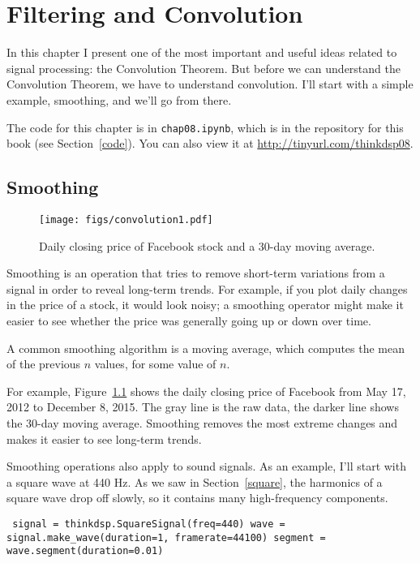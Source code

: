 \documentclass[12pt]{book} \usepackage[width=5.5in,height=8.5in, hmarginratio=3:2,vmarginratio=1:1]{geometry}
\begin{document}
\chapter{Filtering and Convolution} 

In this chapter I present one of the most important and useful ideas related to signal processing: the Convolution Theorem. But before we can understand the Convolution Theorem, we have to understand convolution. I'll start with a simple example, smoothing, and we'll go from there. 

The code for this chapter is in {\tt chap08.ipynb}, which is in the repository for this book (see Section~\ref{code}). You can also view it at \url{http://tinyurl.com/thinkdsp08}. 

\section{Smoothing} \label{smoothing} 

\begin{figure} 

\centerline{\texttt{[image: figs/convolution1.pdf]}} \caption{Daily closing price of Facebook stock and a 30-day moving average.} \label{fig.convolution1} \end{figure} 

Smoothing is an operation that tries to remove short-term variations from a signal in order to reveal long-term trends. For example, if you plot daily changes in the price of a stock, it would look noisy; a smoothing operator might make it easier to see whether the price was generally going up or down over time. 

A common smoothing algorithm is a moving average, which computes the mean of the previous $n$ values, for some value of $n$. 

For example, Figure~\ref{fig.convolution1} shows the daily closing price of Facebook from May 17, 2012 to December 8, 2015. The gray line is the raw data, the darker line shows the 30-day moving average. Smoothing removes the most extreme changes and makes it easier to see long-term trends. 

Smoothing operations also apply to sound signals. As an example, I'll start with a square wave at 440 Hz. As we saw in Section~\ref{square}, the harmonics of a square wave drop off slowly, so it contains many high-frequency components. 

\begin{verbatim} signal = thinkdsp.SquareSignal(freq=440) wave = signal.make_wave(duration=1, framerate=44100) segment = wave.segment(duration=0.01) \end{verbatim} 
\end{document}
